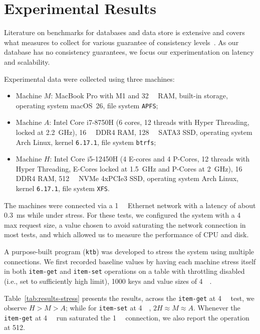 \section{Experimental Results}
\label{sec:results}

Literature on benchmarks for databases and data store is extensive
and covers what measures to collect for various guarantee of consistency levels~\cite{ConsistencyOverview}.
As our database has no consistency guarantees, we focus our experimentation on latency and scalability.

Experimental data were collected using three machines:
\begin{itemize}
    \item Machine $M$: MacBook Pro with M1 and \qty{32}{\giga\byte} RAM, built-in storage, operating system macOS~26, file system \texttt{APFS};
    \item Machine $A$: Intel Core i7-8750H (6 cores, 12 threads with Hyper Threading, locked at \qty{2.2}{\giga\hertz}), \qty{16}{\giga\byte} DDR4 RAM, \qty{128}{\giga\byte} SATA3 SSD, operating system Arch Linux, kernel \texttt{6.17.1}, file system \texttt{btrfs};
    \item Machine $H$: Intel Core i5-12450H (4 E-cores and 4 P-Cores, 12 threads with Hyper Threading, E-Cores locked at \qty{1.5}{\giga\hertz} and P-Cores at \qty{2}{\giga\hertz}), \qty{16}{\giga\byte} DDR4 RAM, \qty{512}{\giga\byte} NVMe 4xPCIe3 SSD, operating system Arch Linux, kernel \texttt{6.17.1}, file system \texttt{XFS}.
\end{itemize}

The machines were connected via a \qty{1}{\giga\bit} Ethernet network with a latency of about \qty{0.3}{\milli\second} while under stress.
For these tests, we configured the system with a \qty{4}{\kilo\byte} max request size,
a value chosen to avoid saturating the network connection in most tests,
and which allowed us to measure the performance of CPU and disk.

A purpose-built program (\texttt{ktb}) was developed to stress the system using multiple connections.
We first recorded baseline values by having each machine stress itself in both \texttt{item-get} and \texttt{item-set} operations
on a table with throttling disabled (i.e., set to sufficiently high limit),
1000 keys and value sizes of \qty{4}{\kilo\byte}.

Table~\ref{tab:results-stress} presents the results, across the \texttt{item-get} at \qty{4}{\kilo\byte} test, we observe $H > M > A$;
while for \texttt{item-set} at \qty{4}{\kilo\byte}, $2H \approx M \approx A$.
Whenever the \texttt{item-get} at \qty{4}{\kilo\byte} run saturated the \qty{1}{\giga\bit} connection,
we also report the operation at \qty{512}{\byte}.

